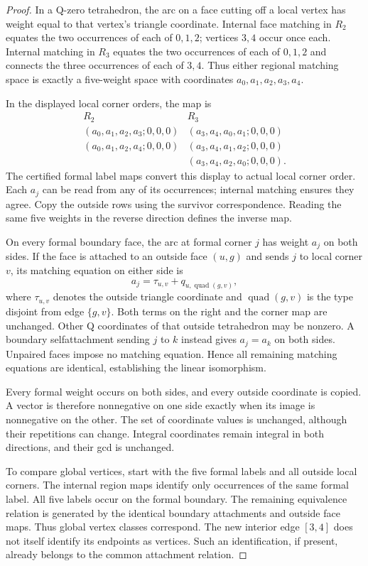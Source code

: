 \begin{proof}
In a Q-zero tetrahedron, the arc on a face cutting off a local vertex
has weight equal to that vertex's triangle coordinate.  Internal face
matching in $R_2$ equates the two occurrences of each of $0,1,2$; vertices
$3,4$ occur once each.  Internal matching in $R_3$ equates the two
occurrences of each of $0,1,2$ and connects the three occurrences of each
of $3,4$.  Thus either regional matching space is exactly a five-weight
space with coordinates $a_0,a_1,a_2,a_3,a_4$.

In the displayed local corner orders, the map is
\[
\begin{array}{c|c}
 R_2 & R_3\\ \hline
 (a_0,a_1,a_2,a_3;0,0,0)&(a_3,a_4,a_0,a_1;0,0,0)\\
 (a_0,a_1,a_2,a_4;0,0,0)&(a_3,a_4,a_1,a_2;0,0,0)\\
                         &(a_3,a_4,a_2,a_0;0,0,0).
\end{array}
\]
The certified formal label maps convert this display to actual local
corner order.  Each $a_j$ can be read from any of its occurrences;
internal matching ensures they agree.  Copy the outside rows using the
survivor correspondence.  Reading the same five weights in the reverse
direction defines the inverse map.

On every formal boundary face, the arc at formal corner $j$ has weight
$a_j$ on both sides.  If the face is attached to an outside face $(u,g)$
and sends $j$ to local corner $v$, its matching equation on either side is
\[
 a_j=\tau_{u,v}+q_{u,\operatorname{quad}(g,v)},
\]
where $\tau_{u,v}$ denotes the outside triangle coordinate and
$\operatorname{quad}(g,v)$ is the type disjoint from edge $\{g,v\}$.
Both terms on the right and the corner map are unchanged.  Other Q
coordinates of that outside tetrahedron may be nonzero.  A boundary
selfattachment sending $j$ to $k$ instead gives $a_j=a_k$ on both sides.
Unpaired faces impose no matching equation.  Hence all remaining matching
equations are identical, establishing the linear isomorphism.

Every formal weight occurs on both sides, and every outside coordinate
is copied.  A vector is therefore nonnegative on one side exactly when
its image is nonnegative on the other.  The set of coordinate values is
unchanged, although their repetitions can change.  Integral coordinates
remain integral in both directions, and their gcd is unchanged.

To compare global vertices, start with the five formal labels and all
outside local corners.  The internal region maps identify only occurrences
of the same formal label.  All five labels occur on the formal boundary.
The remaining equivalence relation is generated by the identical boundary
attachments and outside face maps.  Thus global vertex classes correspond.
The new interior edge $[3,4]$ does not itself identify its endpoints as
vertices.  Such an identification, if present, already belongs to the
common attachment relation.


\end{proof}
